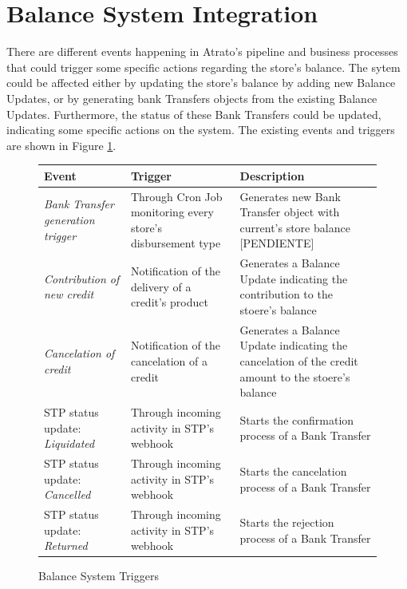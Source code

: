 \section{Balance System Integration}

There are different events happening in Atrato's pipeline and business processes that could trigger some specific actions regarding the store's balance. The sytem could be affected either by updating the store's balance by adding new Balance Updates, or by generating bank Transfers objects from the existing Balance Updates. Furthermore, the status of these Bank Transfers could be updated, indicating some specific actions on the system. The existing events and triggers are shown in Figure \ref{fig:balance_system_triggers}.

\begin{figure}[H]
    \caption{Balance System Triggers}\label{fig:balance_system_triggers}
    \begin{tabularx}{1\textwidth} { 
    | >{\centering\arraybackslash}X 
    | >{\centering\arraybackslash}X 
    | >{\raggedright\arraybackslash}X | }
   \hline
   Event & Trigger & Description \\
   \hline
   \textit{Bank Transfer generation trigger} & Through Cron Job monitoring every store's disbursement type & Generates new Bank Transfer object with current's store balance [PENDIENTE]   \\
   \hline
   \textit{Contribution of new credit} & Notification of the delivery of a credit's product & Generates a Balance Update indicating the contribution to the stoere's balance  \\
   \hline
   \textit{Cancelation of credit} & Notification of the cancelation of a credit & Generates a Balance Update indicating the cancelation of the credit amount to the stoere's balance  \\
   \hline
   STP status update: \textit{Liquidated} & Through incoming activity in STP's webhook & Starts the confirmation process of a Bank Transfer   \\
   \hline
   STP status update: \textit{Cancelled} & Through incoming activity in STP's webhook & Starts the cancelation process of a Bank Transfer   \\
   \hline
   STP status update: \textit{Returned} & Through incoming activity in STP's webhook & Starts the rejection process of a Bank Transfer   \\
   \hline
\end{tabularx}
\end{figure}

